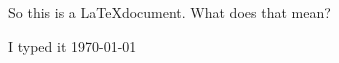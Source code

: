 \documentclass{article}
\begin{document}
So this is a \LaTeX document. What does that mean?

I typed it \today
\end{document}
